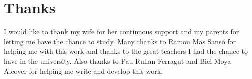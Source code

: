 \chapter{Thanks}
I would like to thank my wife for her continuous support and my parents for letting me
have the chance to study. Many thanks to Ramon Mas Sansó for helping me with this work
and thanks to the great teachers I had the chance to have in the university. 
Also thanks to Pau Rullan Ferragut and Biel Moya Alcover for helping me write and develop
this work.
